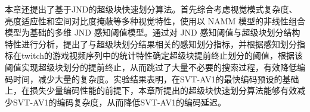   本章还提出了基于JND的超级块快速划分算法。首先综合考虑视觉模式复杂度、亮度适应性和空间对比度掩蔽等多种视觉特性，使用以 NAMM 模型的非线性组合模型为基础的多维 JND 感知阈值模型。通过对 JND 感知阈值与超级块划分结构特性进行分析，提出了与超级块划分结果相关的感知划分指标，并根据感知划分指标在twitch的游戏视频序列中的统计特性确定超级块提前终止划分的阈值，根据该阈值实现超级块划分的提前终止，从而跳过了大量不必要的搜索过程，有效降低编码时间，减少大量的复杂度。实验结果表明，在SVT-AV1的最快编码预设的基础上，在损失少量编码性能的前提下，本章所提出的超级块快速划分算法能够有效减少SVT-AV1的编码复杂度，从而降低SVT-AV1的编码延迟。